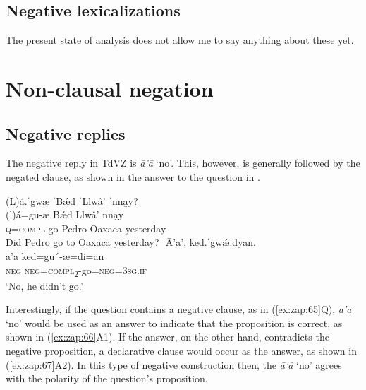 \documentclass[output=paper,colorlinks=true, citecolor=brown]{langscibook}
\begin{document}
\subsection{Negative lexicalizations}\label{sec:zap:2.5}

The present state of analysis does not allow me to say anything about these yet.

\section{Non-clausal negation}\label{sec:zap:3}
\subsection{Negative replies}\label{sec:zap:3.1}

The negative reply in TdVZ is \textit{ā'ā} ‘no’. This, however, is generally followed by the negated clause, as shown in the answer to the question in .

\ea\label{ex:zap:6364}
    \begin{xlist}[B: ]
    \label{ex:zap:63} 
        \glll (L)á.ˈgwæ ˈBǽd ˈLlwâ’ ˈnna̰y?\\ 
          (l)á=gu-æ Bǽd Llwâ’ nna̰y \\
          \textsc{q}=\textsc{compl}{}-go Pedro Oaxaca yesterday\\
    \glt  Did Pedro go to Oaxaca yesterday?
    \label{ex:zap:64} 
        \glll ˈĀ'ā', kēd.ˈgwǽ.dyan.\\ 
           ā'ā kēd=gu´-æ=di=an\\
           \textsc{neg} \textsc{neg}=\textsc{compl}\textsc{\textsubscript{2}}{}-go=\textsc{neg}=\textsc{3sg.if}\\
    \glt ‘No, he didn’t go.’
    \end{xlist}
\z 

Interestingly, if the question contains a negative clause, as in (\ref{ex:zap:65}Q), \textit{ā'ā} ‘no’ would be used as an answer to indicate that the proposition is correct, as shown in (\ref{ex:zap:66}A1). If the answer, on the other hand, contradicts the negative proposition, a declarative clause would occur as the answer, as shown in (\ref{ex:zap:67}A2). In this type of negative construction then, the \textit{ā'ā} ‘no’ agrees with the polarity of the question’s proposition. 
\end{document}
